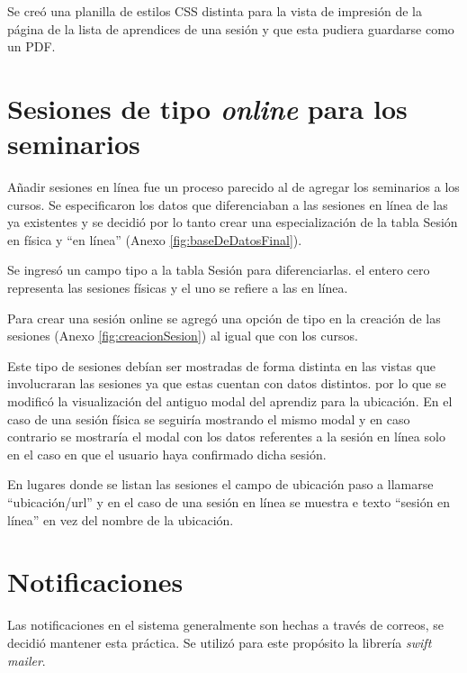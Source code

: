 	Se creó una planilla de estilos \gls{CSS} distinta para la vista de impresión de la página de la lista de aprendices de una sesión y que esta pudiera guardarse como un \gls{PDF}. 


	\section{Sesiones de tipo \emph{online} para los seminarios} %
	\label{sec:sesiones_de_seminario_tipo_}

	Añadir sesiones en línea fue un proceso parecido al de agregar los seminarios a los cursos. Se especificaron los datos que diferenciaban a las sesiones en línea de las ya existentes y se decidió por lo tanto crear una especialización de la tabla Sesión en física y ``en línea'' (Anexo \ref{fig:baseDeDatosFinal}).

	Se ingresó un campo tipo a la tabla Sesión para diferenciarlas. el entero cero representa las sesiones físicas y el uno se refiere a las en línea.

	Para crear una sesión online se agregó una opción de tipo en la creación de las sesiones (Anexo \ref{fig:creacionSesion}) al igual que con los cursos.

	Este tipo de sesiones debían ser mostradas de forma distinta en las vistas que involucraran las sesiones ya que estas cuentan con datos distintos. por lo que se modificó la visualización del antiguo modal del aprendiz para la ubicación. En el caso de una sesión física se seguiría mostrando el mismo modal y en caso contrario se mostraría el modal con los datos referentes a la sesión en línea solo en el caso en que el usuario haya confirmado dicha sesión.

	En lugares donde se listan las sesiones el campo de ubicación paso a llamarse ``ubicación/url'' y en el caso de una sesión en línea se muestra e texto ``sesión en línea'' en vez del nombre de la ubicación. 


	\section{Notificaciones} %
	\label{sec:notificaciones}
	
	Las notificaciones en el sistema generalmente son hechas a través de correos, se decidió mantener esta práctica. Se utilizó para este propósito la librería \emph{swift mailer}.

